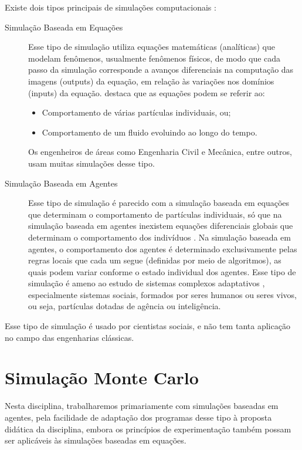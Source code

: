 Existe dois tipos principais de simulações computacionais \citep{winsberg_computer_2019}:
\begin{description}
\item [Simulação Baseada em Equações] Esse tipo de simulação utiliza equações matemáticas (analíticas) que modelam fenômenos, usualmente fenômenos físicos, de modo que cada passo da simulação corresponde a avanços diferenciais na computação das imagens (outputs) da equação, em relação às variações nos domínios (inputs) da equação. \citet{winsberg_computer_2019} destaca que as equações podem se referir ao:
\begin{itemize}
    \item Comportamento de várias partículas individuais, ou;
    \item Comportamento de um fluido evoluindo ao longo do tempo.
\end{itemize}
Os engenheiros de áreas como Engenharia Civil e Mecânica, entre outros, usam muitas simulações desse tipo.

\item [Simulação Baseada em Agentes] Esse tipo de simulação é parecido com a simulação baseada em equações que determinam o comportamento de partículas individuais, só que na simulação baseada em agentes inexistem equações diferenciais globais que determinam o comportamento dos indivíduos \citep{winsberg_computer_2019}. Na simulação baseada em agentes, o comportamento dos agentes é determinado exclusivamente pelas regras locais que cada um segue (definidas por meio de algoritmos), as quais podem variar conforme o estado individual dos agentes. Esse tipo de simulação é ameno ao estudo de sistemas complexos adaptativos \citep{miller_complex_2007}, especialmente sistemas sociais, formados por seres humanos ou seres vivos, ou seja, partículas dotadas de agência ou inteligência.
\end{description}

Esse tipo de simulação é usado por cientistas sociais, e não tem tanta aplicação no campo das engenharias clássicas.

\section{Simulação Monte Carlo}

Nesta disciplina, trabalharemos primariamente com simulações baseadas em agentes, pela facilidade de adaptação dos programas desse tipo à proposta didática da disciplina, embora os princípios de experimentação também possam ser aplicáveis às simulações baseadas em equações.

